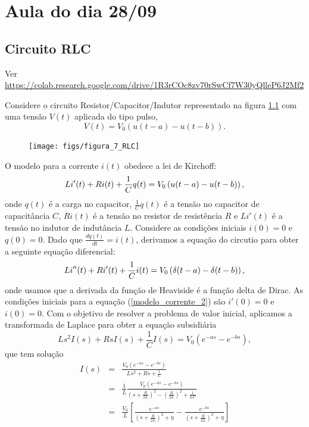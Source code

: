 \documentclass[a4paper,10pt]{book}
\begin{document}
 
 
 \chapter{Aula do dia 28/09}
  


\section{Circuito RLC}{\label{sec_circ_2}}
Ver \url{https://colab.research.google.com/drive/1R3rCOc8zv70rSwCf7W30yQlleP6J2Mf2}

Considere o circuito Resistor/Capacitor/Indutor representado na figura \ref{fig_circ_2} com uma tensão $V(t)$ aplicada do tipo pulso,
\begin{equation}
V(t)=V_0\left(u(t-a)-u(t-b)\right).
\end{equation}
\begin{figure}[!ht]
\begin{center}

\texttt{[image: figs/figura\_7\_RLC]}\end{center}
\caption{\label{fig_circ_2}}
\end{figure} 
 O modelo para a corrente $i(t)$ obedece a lei de Kirchoff:
 \begin{equation}{\label{modelo_corrente}}
 Li'(t)+ Ri(t)+\frac{1}{C}q(t)=V_0\left(u(t-a)-u(t-b)\right),
 \end{equation}
 onde $q(t)$ é a carga no capacitor, $\frac{1}{C}q(t)$ é a tensão no capacitor de capacitância $C$, $Ri(t)$ é a tensão no resistor de resistência $R$ e $Li'(t)$ é a tensão no indutor de indutância $L$. Considere as condições iniciais $i(0)=0$ e $q(0)=0$.
 Dado que $\frac{dq(t)}{dt}=i(t)$, derivamos a equação do circutio para obter a seguinte equação diferencial:
 \begin{equation}{\label{modelo_corrente_2}}
 Li''(t)+ Ri'(t)+\frac{1}{C}i(t)=V_0\left(\delta(t-a)-\delta(t-b)\right),
 \end{equation}
 onde usamos que a derivada da função de Heaviside é a função delta de Dirac. As condições iniciais para a equação (\ref{modelo_corrente_2}) são $i'(0)=0$ e $i(0)=0$. Com o objetivo de resolver a problema de valor inicial, aplicamos a transformada de Laplace para obter a equação subsidiária
 \begin{equation*}
 Ls^2I(s)+ RsI(s)+\frac{1}{C}I(s)=V_0\left(e^{-as}-e^{-bs}\right),
 \end{equation*}
 que tem solução
% 
% 
 \begin{eqnarray*}
 I(s)&=&\frac{V_0\left(e^{-as}-e^{-bs}\right)}{Ls^2+Rs+\frac{1}{C}}\\
 &=&\frac{1}{L}\frac{V_0\left(e^{-as}-e^{-bs}\right)}{\left(s+\frac{R}{2L}\right)^2-\left(\frac{R}{2L}\right)^2+\frac{1}{LC}}\\
 &=&\frac{V_0}{L}\left[\frac{e^{-as}}{\left(s+\frac{R}{2L}\right)^2+\eta}-\frac{e^{-bs}}{\left(s+\frac{R}{2L}\right)^2+\eta}\right]
 \end{eqnarray*}
\end{document}
